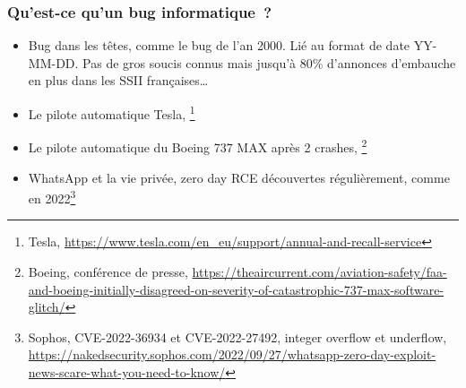 \documentclass{beamer}
\begin{document}
    \begin{frame}
        \transdissolve
        \frametitle{Qu'est-ce qu'un bug informatique~?}
        \begin{itemize}

            \item Bug dans les têtes, comme le bug de l'an 2000.
            Lié au format de date YY-MM-DD. Pas de gros soucis connus mais jusqu'à 80\% d'annonces d'embauche en plus dans les SSII françaises…
            \item Le pilote automatique Tesla, \footnote{Tesla, \url{https://www.tesla.com/en_eu/support/annual-and-recall-service}}
            \item Le pilote automatique du Boeing 737 MAX après 2 crashes, \footnote{Boeing, conférence de presse, \url{https://theaircurrent.com/aviation-safety/faa-and-boeing-initially-disagreed-on-severity-of-catastrophic-737-max-software-glitch/}}
            \item WhatsApp et la vie privée, zero day RCE découvertes régulièrement, comme en 2022\footnote{Sophos, CVE-2022-36934 et CVE-2022-27492, integer overflow et underflow, \url{https://nakedsecurity.sophos.com/2022/09/27/whatsapp-zero-day-exploit-news-scare-what-you-need-to-know/}}
        \end{itemize}
    \end{frame}
\end{document}
